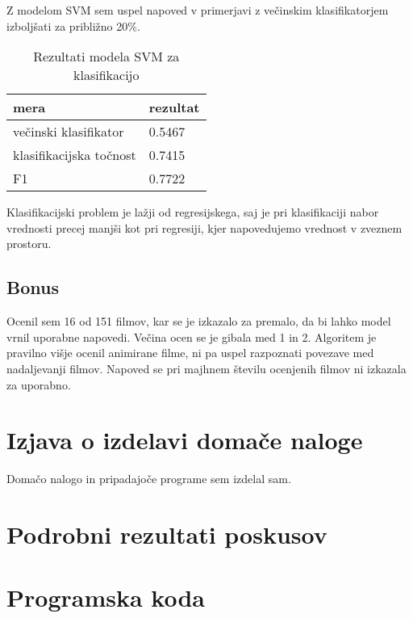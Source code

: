 \documentclass[a4paper,11pt]{article}
\begin{document}
Z modelom SVM sem uspel napoved v primerjavi z večinskim klasifikatorjem izboljšati 
za približno 20\%.

\begin{table}[htbp]
\caption{Rezultati modela SVM za klasifikacijo}
\label{tab2}
\begin{center}
\begin{tabular}{lp{4cm}}
\hline
mera & rezultat \\
\hline
večinski klasifikator & 0.5467 \\
klasifikacijska točnost & 0.7415 \\
F1 & 0.7722 \\
\hline
\end{tabular}
\end{center}
\end{table}

Klasifikacijski problem je lažji od regresijskega, saj je pri klasifikaciji nabor vrednosti 
precej manjši kot pri regresiji, kjer napovedujemo vrednost v zveznem prostoru.

\subsection{Bonus}
Ocenil sem 16 od 151 filmov, kar se je izkazalo za premalo, da bi lahko model vrnil uporabne 
napovedi. Večina ocen se je gibala med 1 in 2. Algoritem je pravilno višje ocenil animirane filme,
ni pa uspel razpoznati povezave med nadaljevanji filmov. Napoved se pri majhnem številu ocenjenih
filmov ni izkazala za uporabno.

\section{Izjava o izdelavi domače naloge}
Domačo nalogo in pripadajoče programe sem izdelal sam.

\appendix
\appendixpage
\section{\label{app-res}Podrobni rezultati poskusov}




\section{\label{app-code}Programska koda}
\end{document}
